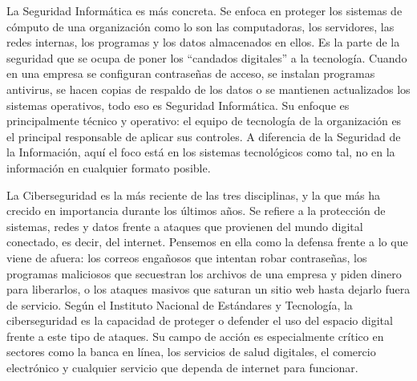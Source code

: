 \documentclass[
	article,			%
	11pt,				%
	oneside,			%
	a4paper,			%
	english,			%
	brazil,				%
	sumario=tradicional
	]{abntex2}
\begin{document}
La Seguridad Informática es más concreta. Se enfoca en proteger los sistemas de cómputo de una organización como lo son las computadoras, los servidores, las redes internas, los programas y los datos almacenados en ellos. Es la parte de la seguridad que se ocupa de poner los “candados digitales” a la tecnología. Cuando en una empresa se configuran contraseñas de acceso, se instalan programas antivirus, se hacen copias de respaldo de los datos o se mantienen actualizados los sistemas operativos, todo eso es Seguridad Informática. Su enfoque es principalmente técnico y operativo: el equipo de tecnología de la organización es el principal responsable de aplicar sus controles. A diferencia de la Seguridad de la Información, aquí el foco está en los sistemas tecnológicos como tal, no en la información en cualquier formato posible.

La Ciberseguridad es la más reciente de las tres disciplinas, y la que más ha crecido en importancia durante los últimos años. Se refiere a la protección de sistemas, redes y datos frente a ataques que provienen del mundo digital conectado, es decir, del internet. Pensemos en ella como la defensa frente a lo que viene de afuera: los correos engañosos que intentan robar contraseñas, los programas maliciosos que secuestran los archivos de una empresa y piden dinero para liberarlos, o los ataques masivos que saturan un sitio web hasta dejarlo fuera de servicio. Según el Instituto Nacional de Estándares y Tecnología, la ciberseguridad es la capacidad de proteger o defender el uso del espacio digital frente a este tipo de ataques. Su campo de acción es especialmente crítico en sectores como la banca en línea, los servicios de salud digitales, el comercio electrónico y cualquier servicio que dependa de internet para funcionar.
\end{document}
